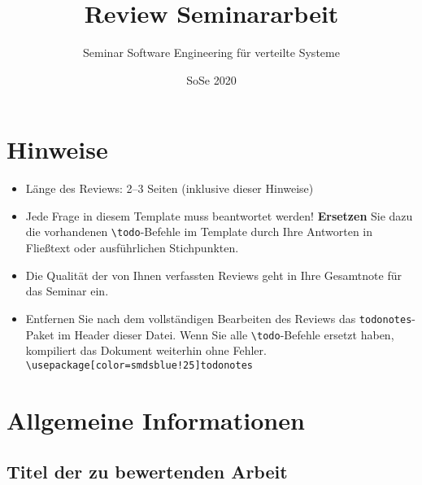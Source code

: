 \documentclass[a4paper,DIV=16]{scrartcl}
\begin{document}
\title{Review Seminararbeit}
\date{SoSe 2020}

\subtitle{Seminar Software Engineering für verteilte Systeme}

\author{}

\maketitle
\thispagestyle{empty}

\section*{Hinweise}
\begin{itemize}
\item Länge des Reviews: 2--3 Seiten (inklusive dieser Hinweise)
\item Jede Frage in diesem Template muss beantwortet werden! \textbf{Ersetzen} Sie dazu die vorhandenen \texttt{\textbackslash{}todo}-Befehle im Template durch Ihre Antworten in Fließtext oder ausführlichen Stichpunkten.
\item Die Qualität der von Ihnen verfassten Reviews geht in Ihre Gesamtnote für das Seminar ein.
\item Entfernen Sie nach dem vollständigen Bearbeiten des Reviews das \texttt{todonotes}-Paket im Header dieser Datei. Wenn Sie alle \texttt{\textbackslash{}todo}-Befehle ersetzt haben, kompiliert das Dokument weiterhin ohne Fehler.  \texttt{\textbackslash{}usepackage[color=smdsblue!25]{todonotes}}
\end{itemize}

\section*{Allgemeine Informationen}
\subsection*{Titel der zu bewertenden Arbeit}
\end{document}
